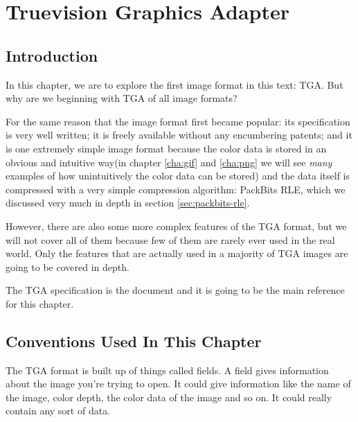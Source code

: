 \begin{comment}
  
\end{comment}


\newcommand{\lzwdotsrow}{eric}

\chapter{Truevision Graphics Adapter}
\label{cha:tga}

\section{Introduction}
\label{sec:tga-introduction}

In this chapter, we are to explore the first image format in this
text: TGA. But why are we beginning with TGA of all image
formats?

For the same reason that the image format first became popular: its
specification is very well written; it is freely available without any
encumbering patents; and it is one extremely simple image format
because the color data is stored in an obvious and intuitive way(in
chapter \ref{cha:gif} and \ref{cha:png} we will see \textit{many}
examples of how unintuitively the color data can be stored) and the
data itself is compressed with a very simple compression algorithm:
PackBits RLE, which we discussed very much in depth in section
\ref{sec:packbits-rle}. \cite{murray1996encyclopedia}

However, there are also some more complex features of the TGA format,
but we will not cover all of them because few of them are rarely ever
used in the real world. Only the features that are actually used in a
majority of TGA images are going to be covered in depth.

The TGA specification is the document
\cite{91:_truev_tga_file_format_specif} and it is going to be the main
reference for this chapter.

\section{Conventions Used In This Chapter}

The TGA format is built up of things called fields. A
field gives information about the image you're trying to open. It
could give information like the name of the image, color depth, the
color data of the image and so on. It could really contain any sort of
data.

